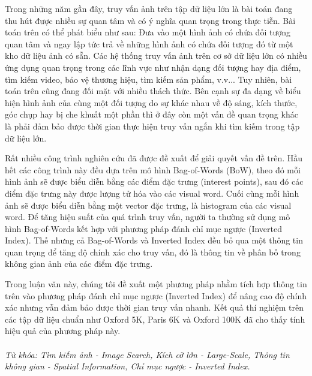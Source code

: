\begin{abstracts}         
Trong những năm gần đây, truy vấn ảnh trên tập dữ liệu lớn là bài toán đang thu hút được nhiều sự quan tâm và có ý nghĩa quan trọng trong thực tiễn. Bài toán trên có thể phát biểu như sau: Đưa vào một hình ảnh có chứa đối tượng quan tâm và ngay lập tức trả về những hình ảnh có chứa đối tượng đó từ một kho dữ liệu ảnh có sẵn. Các hệ thống truy vấn ảnh trên cơ sở dữ liệu lớn có nhiều ứng dụng quan trọng trong các lĩnh vực như nhận dạng đối tượng hay địa điểm, tìm kiếm video, bảo vệ thương hiệu, tìm kiếm sản phẩm, v.v... Tuy nhiên, bài toán trên cũng đang đối mặt với nhiều thách thức. Bên cạnh sự đa dạng về biểu hiện hình ảnh của cùng một đối tượng do sự khác nhau về độ sáng, kích thước, góc chụp hay bị che khuất một phần thì ở đây còn một vấn đề quan trọng khác là phải đảm bảo được thời gian thực hiện truy vấn ngắn khi tìm kiếm trong tập dữ liệu lớn.

Rất nhiều công trình nghiên cứu đã được đề xuất để giải quyết vấn đề trên. Hầu hết các công trình này đều dựa trên mô hình Bag-of-Words (BoW), theo đó mỗi hình ảnh sẽ được biểu diễn bằng các điểm đặc trưng (interest points), sau đó các điểm đặc trưng này được lượng tử hóa vào các visual word. Cuối cùng mỗi hình ảnh sẽ được biểu diễn bằng một vector đặc trưng, là histogram của các visual word. Để tăng hiệu suất của quá trình truy vấn, người ta thường sử dụng mô hình Bag-of-Words kết hợp với phương pháp đánh chỉ mục ngược (Inverted Index). Thế nhưng cả Bag-of-Words và Inverted Index đều bỏ qua một thông tin quan trọng để tăng độ chính xác cho truy vấn, đó là thông tin về phân bố trong không gian ảnh của các điểm đặc trưng. 

Trong luận văn này, chúng tôi đề xuất một phương pháp nhằm tích hợp thông tin trên vào phương pháp đánh chỉ mục ngược (Inverted Index) để nâng cao độ chính xác nhưng vẫn đảm bảo được thời gian truy vấn nhanh. Kết quả thí nghiệm trên các tập dữ liệu chuẩn như Oxford 5K, Paris 6K và Oxford 100K đã cho thấy tính hiệu quả của phương pháp này.\\
\\
\textit{Từ khóa: Tìm kiếm ảnh - Image Search, Kích cỡ lớn - Large-Scale, Thông tin không gian - Spatial Information, Chỉ mục ngược - Inverted Index.}

\end{abstracts}
 